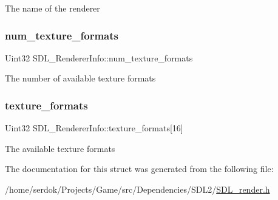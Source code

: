 The name of the renderer \mbox{\label{structSDL__RendererInfo_acdec165b2053b914313f5996983ec6b8}} 
\subsubsection{\texorpdfstring{num\+\_\+texture\+\_\+formats}{num\_texture\_formats}}
{\footnotesize\ttfamily Uint32 S\+D\+L\+\_\+\+Renderer\+Info\+::num\+\_\+texture\+\_\+formats}

The number of available texture formats \mbox{\label{structSDL__RendererInfo_a88450f9d48e593ec4571e3ba7cc3427d}} 
\subsubsection{\texorpdfstring{texture\+\_\+formats}{texture\_formats}}
{\footnotesize\ttfamily Uint32 S\+D\+L\+\_\+\+Renderer\+Info\+::texture\+\_\+formats\mbox{[}16\mbox{]}}

The available texture formats 

The documentation for this struct was generated from the following file\+:\begin{DoxyCompactItemize}
\item 
/home/serdok/\+Projects/\+Game/src/\+Dependencies/\+S\+D\+L2/\hyperlink{SDL__render_8h}{S\+D\+L\+\_\+render.\+h}\end{DoxyCompactItemize}

